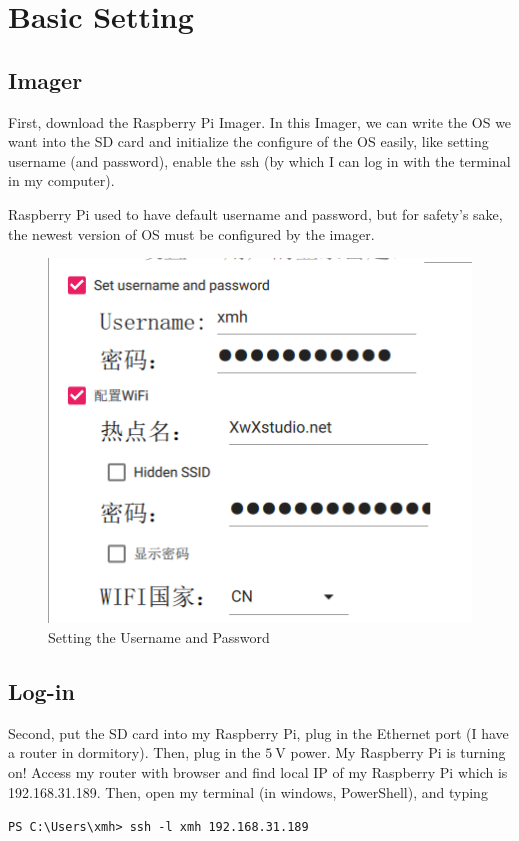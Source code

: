 \documentclass{article}
\begin{document}
\section{Basic Setting}

\label{sec:basicSetting}

\subsection{Imager}
First, download the Raspberry Pi Imager. In this Imager, we can write the OS we want into the SD card and initialize the configure of the OS easily, like setting username (and password), enable the ssh (by which I can log in with the terminal in my computer).

Raspberry Pi used to have default username and password, but for safety's sake, the newest version of OS must be configured by the imager.

\begin{figure}[!h]
	\centering
	\includegraphics[width=3 in]{../pic/raspi-imager}
	\caption{Setting the Username and Password}
	\label{fig:raspi-imager}
\end{figure}

\subsection{Log-in}

Second, put the SD card into my Raspberry Pi, plug in the Ethernet port (I have a router in dormitory). Then, plug in the $5 ~\mathrm{V}$ power. My Raspberry Pi is turning on! Access my router with browser and find local IP of my Raspberry Pi which is 192.168.31.189. Then, open my terminal (in windows, PowerShell), and typing

\begin{center}
\verb|PS C:\Users\xmh> ssh -l xmh 192.168.31.189|
\end{center}
\end{document}

